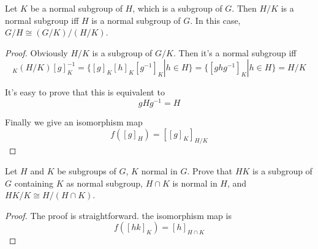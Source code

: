 \documentclass[12pt]{book}
\begin{document}
	\begin{theorem}
		Let $K$ be a normal subgroup of $H$, which is a subgroup of $G$. Then $H/K$ is a normal subgroup iff $H$ is a normal subgroup of $G$. In this case, $G/H\cong (G/K)/(H/K)$.
	\end{theorem}
	\begin{proof}
		Obviously $H/K$ is a subgroup of $G/K$. Then it's a normal subgroup iff
		\begin{equation}
			[g]_K(H/K)[g]_K^{-1}=\{[g]_K[h]_K[g^{-1}]_K|h\in H\}=\{[ghg^{-1}]_K|h\in H\}=H/K
		\end{equation}
		
		It's easy to prove that this is equivalent to
		\begin{equation}
			gHg^{-1}=H
		\end{equation}
		
		Finally we give an isomorphism map
		\begin{equation}
			f([g]_H)=[[g]_K]_{H/K}
		\end{equation}
		
	\end{proof}
	\begin{theorem}
		Let $H$ and $K$ be subgroups of $G$, $K$ normal in $G$. Prove that $HK$ is a subgroup of $G$ containing $K$ as normal subgroup, $H\cap K$ is normal in $H$, and $HK/K\cong H/(H\cap K)$.\
	\end{theorem}
	\begin{proof}
		The proof is straightforward. the isomorphism map is 
		\begin{equation}
			f([hk]_K)=[h]_{H\cap K}
		\end{equation}
	\end{proof}
\end{document}
